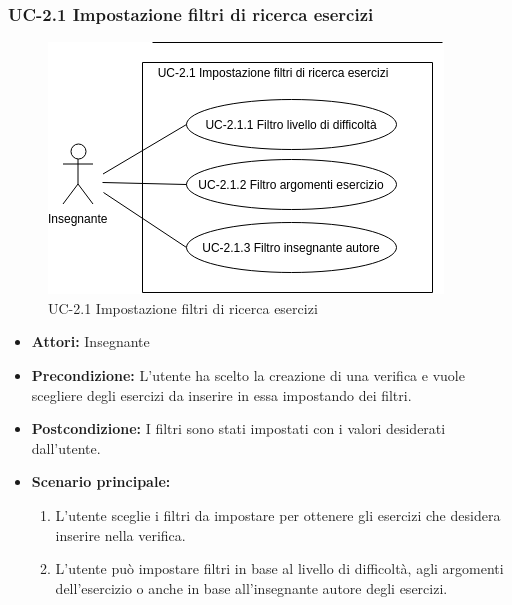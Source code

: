 \subsubsection{UC-2.1 Impostazione filtri di ricerca esercizi}

\begin{figure}[htbp]
	\centering
	\includegraphics[scale=0.7]{images/UC-2_1.png}
	\caption{UC-2.1 Impostazione filtri di ricerca esercizi}
\end{figure}
\begin{itemize}
		\item \textbf{Attori: } Insegnante
		
		\item \textbf{Precondizione: }L'utente ha scelto la creazione di una verifica e vuole scegliere degli esercizi da inserire in essa impostando dei filtri.
		\item \textbf{Postcondizione: }I filtri sono stati impostati con i valori desiderati dall'utente.			\item \textbf{Scenario principale: }
		\begin{enumerate}
		\item L'utente sceglie i filtri da impostare per ottenere gli esercizi che desidera inserire nella verifica. 
		\item L'utente può impostare filtri in base al livello di difficoltà, agli argomenti dell'esercizio o anche in base all'insegnante autore degli esercizi.
		\end{enumerate}

\end{itemize}
